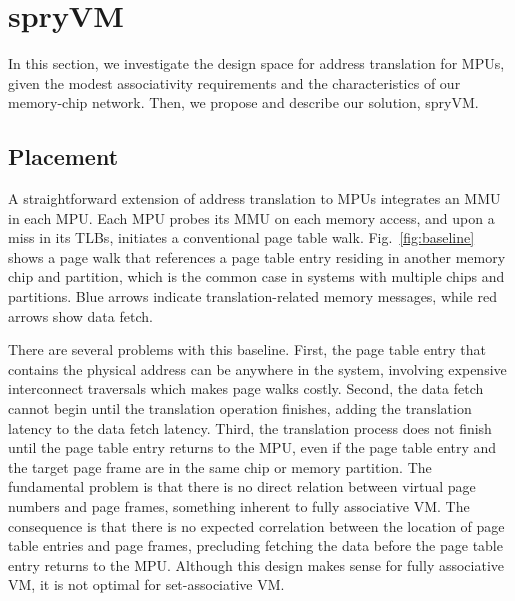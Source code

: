 \section{spryVM}
\label{sec:msmmu}


In this section, we investigate the design space for address translation for MPUs, given the modest associativity requirements and the characteristics of our memory-chip network. Then, we propose and describe our solution, spryVM.

\subsection{Placement}

A straightforward extension of address translation to MPUs integrates an MMU in each MPU. Each MPU probes its MMU on each memory access, and upon a miss in its TLBs, initiates a conventional page table walk. Fig.~\ref{fig:baseline} shows a page walk that references a page table entry residing in another memory chip and partition, which is the common case in systems with multiple chips and partitions. Blue arrows indicate translation-related memory messages, while red arrows show data fetch. %



There are several problems with this baseline. First, the page table entry that contains the physical address can be anywhere in the system, involving expensive interconnect traversals which makes page walks costly. Second, the data fetch cannot begin until the translation operation finishes, adding the translation latency to the data fetch latency. Third, the translation process does not finish until the page table entry returns to the MPU, even if the page table entry and the target page frame are in the same chip or memory partition. The fundamental problem is that there is no direct relation between virtual page numbers and page frames, something inherent to fully associative VM. The consequence is that there is no expected correlation between the location of page table entries and page frames, precluding fetching the data before the page table entry returns to the MPU. Although this design makes sense for fully associative VM, it is not optimal for set-associative VM.


